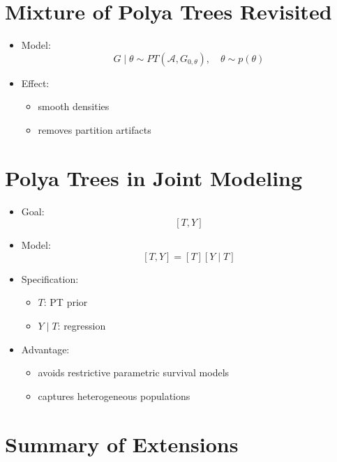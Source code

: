 \documentclass[12pt,oneside]{book}
\numberwithin{equation}{section}
\theoremstyle{definition}
\theoremstyle{plain}
\theoremstyle{remark}
\begin{document}
\section{Mixture of Polya Trees Revisited}

\begin{itemize}
\item Model:
\[
G \mid \theta \sim PT(\mathcal{A}, G_{0,\theta}), \quad \theta \sim p(\theta)
\]

\item Effect:
\begin{itemize}
\item smooth densities
\item removes partition artifacts
\end{itemize}
\end{itemize}

\section{Polya Trees in Joint Modeling}

\begin{itemize}
\item Goal:
\[
[T,Y]
\]

\item Model:
\[
[T,Y] = [T][Y \mid T]
\]

\item Specification:
\begin{itemize}
\item $T$: PT prior
\item $Y \mid T$: regression
\end{itemize}

\item Advantage:
\begin{itemize}
\item avoids restrictive parametric survival models
\item captures heterogeneous populations
\end{itemize}
\end{itemize}

\section{Summary of Extensions}
\end{document}

